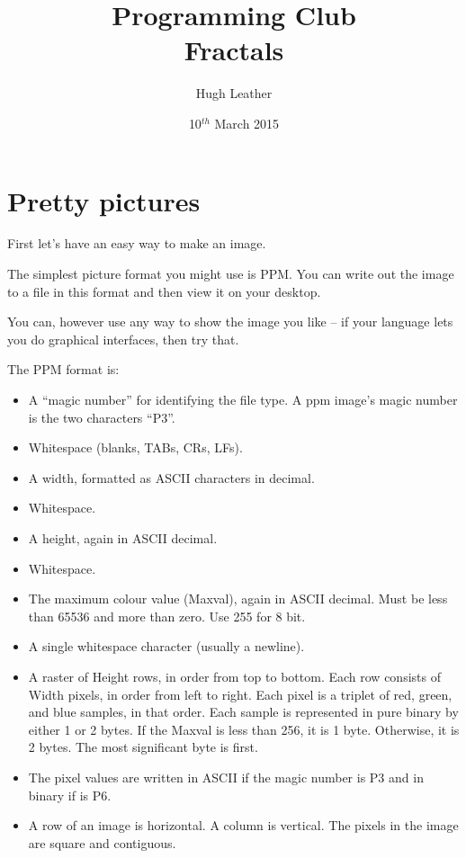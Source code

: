 \documentclass{article}
\title{
    \textbf{Programming Club}\\
    Fractals
}
\author{Hugh Leather}
\date{10$^{th}$ March 2015}
\begin{document}
    \maketitle
    
    \section{Pretty pictures}
        First let's have an easy way to make an image.  

        The simplest picture format you might use is PPM.  You can write out the image to a file in this format and then view it on your 
        desktop.
        
        You can, however use any way to show the image you like -- if your language lets you do graphical interfaces, then try that.
        
        The PPM format is:
        \begin{itemize}
            \item A ``magic number'' for identifying the file type. A ppm image's magic number is the two characters ``P3''.
            \item Whitespace (blanks, TABs, CRs, LFs).
            \item A width, formatted as ASCII characters in decimal.
            \item Whitespace.
            \item A height, again in ASCII decimal.
            \item Whitespace.
            \item The maximum colour value (Maxval), again in ASCII decimal. Must be less than 65536 and more than zero. Use 255 for 8 bit.
            \item A single whitespace character (usually a newline).
            \item A raster of Height rows, in order from top to bottom. Each row consists of Width pixels, in order from left to right.
            Each pixel is a triplet of red, green, and blue samples, in that order. Each sample is represented in pure binary by either 1
            or 2 bytes. If the Maxval is less than 256, it is 1 byte. Otherwise, it is 2 bytes. The most significant byte is first.
	    \item The pixel values are written in ASCII if the magic number is P3 and in binary if is P6.
            \item A row of an image is horizontal. A column is vertical. The pixels in the image are square and contiguous.
        \end{itemize}
\end{document}
